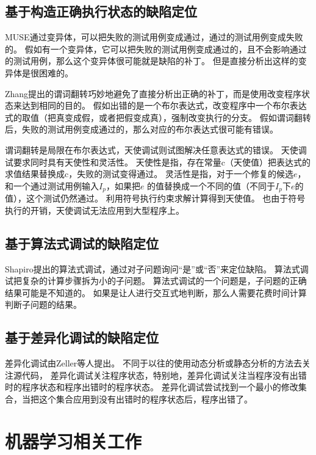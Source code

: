 \subsection{基于构造正确执行状态的缺陷定位}

MUSE通过变异体，可以把失败的测试用例变成通过，通过的测试用例变成失败的。
假如有一个变异体，它可以把失败的测试用例变成通过的，且不会影响通过的测试用例，那么这个变异体很可能就是缺陷的补丁。
但是直接分析出这样的变异体是很困难的。

Zhang提出的谓词翻转\parencite{Zhang2006Locating}巧妙地避免了直接分析出正确的补丁，而是使用改变程序状态来达到相同的目的。
假如出错的是一个布尔表达式，改变程序中一个布尔表达式的取值（把真变成假，或者把假变成真），强制改变执行的分支。
假如谓词翻转后，失败的测试用例变成通过的，那么对应的布尔表达式很可能有错误。

谓词翻转是局限在布尔表达式，天使调试\parencite{Chandra2011Angelic}则试图解决任意表达式的错误。
天使调试要求同时具有天使性和灵活性。
天使性是指，存在常量c（天使值）把表达式的求值结果替换成c，失败的测试变得通过。
灵活性是指，对于一个修复的候选$e$，和一个通过测试用例输入$I_p$，如果把$e$
的值替换成一个不同的值（不同于$I_p$下$e$的值），这个测试仍然通过。
利用符号执行约束求解计算得到天使值。
也由于符号执行的开销，天使调试无法应用到大型程序上。

\subsection{基于算法式调试的缺陷定位}

Shapiro提出的算法式调试\parencite{Shapiro1982Algorithmic}，通过对子问题询问“是”或“否”来定位缺陷。
算法式调试把复杂的计算步骤拆为小的子问题。
算法式调试的一个问题是，子问题的正确结果可能是不知道的。
如果是让人进行交互式地判断，那么人需要花费时间计算判断子问题的结果。

\subsection{基于差异化调试的缺陷定位}

差异化调试由Zeller等人提出\parencite{Zeller2002Isolating,Zeller2002Simplifying}。
不同于以往的使用动态分析或静态分析的方法去关注源代码，
差异化调试关注程序状态，特别地，差异化调试关注当程序没有出错时的程序状态和程序出错时的程序状态。
差异化调试尝试找到一个最小的修改集合，当把这个集合应用到没有出错时的程序状态后，程序出错了。

\section{机器学习相关工作}


